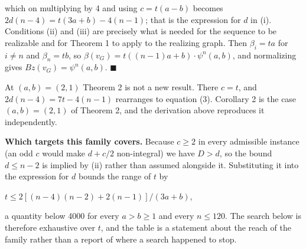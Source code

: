 \documentclass[
]{article}
\begin{document}
which on multiplying by 4 and using \(c = t(a-b)\) becomes
\(2d(n-4) = t(3a+b) - 4(n-1)\); that is the expression for \(d\) in (i).
Conditions (ii) and (iii) are precisely what is needed for the sequence
to be realizable and for Theorem 1 to apply to the realizing graph. Then
\(\beta_i = ta\) for \(i \ne n\) and \(\beta_n = tb\), so
\(\beta(v_G) = t((n-1)a+b)\cdot\psi^n(a,b)\), and normalizing gives
\(Bz(v_G) = \psi^n(a,b)\). \(\blacksquare\)

At \((a,b) = (2,1)\) Theorem 2 is not a new result. There \(c = t\), and
\(2d(n-4) = 7t - 4(n-1)\) rearranges to equation (3). Corollary 2 is the
case \((a,b) = (2,1)\) of Theorem 2, and the derivation above reproduces
it independently.

\textbf{Which targets this family covers.} Because \(c \ge 2\) in every
admissible instance (an odd \(c\) would make \(d + c/2\) non-integral)
we have \(D > d\), so the bound \(d \le n-2\) is implied by (ii) rather
than assumed alongside it. Substituting it into the expression for \(d\)
bounds the range of \(t\) by

\(t \le 2[(n-4)(n-2) + 2(n-1)]/(3a+b)\),

a quantity below 4000 for every \(a > b \ge 1\) and every \(n \le 120\).
The search below is therefore exhaustive over \(t\), and the table is a
statement about the reach of the family rather than a report of where a
search happened to stop.
\end{document}
